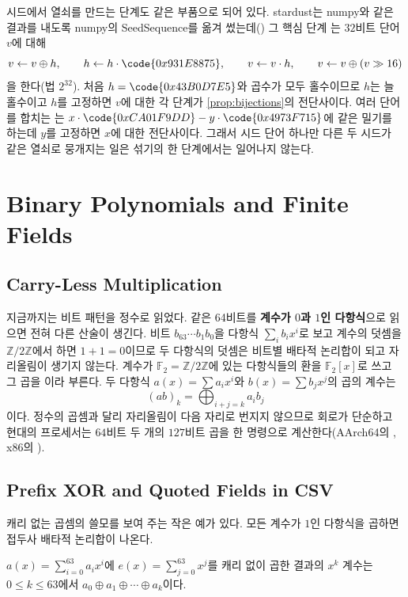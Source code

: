 시드에서 열쇠를 만드는 단계도 같은 부품으로 되어 있다. stardust는 numpy와 같은 결과를 내도록 numpy의 SeedSequence를 옮겨 썼는데() 그 핵심 단계 는 $32$비트 단어 $v$에 대해
\[
v\gets v\oplus h,\qquad h\gets h\cdot\code{0x931E8875},\qquad v\gets v\cdot h,\qquad v\gets v\oplus(v\gg16)
\]
을 한다(법 $2^{32}$). 처음 $h=\code{0x43B0D7E5}$와 곱수가 모두 홀수이므로 $h$는 늘 홀수이고 $h$를 고정하면 $v$에 대한 각 단계가 \cref{prop:bijections}의 전단사이다. 여러 단어를 합치는 는 $x\cdot\code{0xCA01F9DD}-y\cdot\code{0x4973F715}$에 같은 밀기를 하는데 $y$를 고정하면 $x$에 대한 전단사이다. 그래서 시드 단어 하나만 다른 두 시드가 같은 열쇠로 뭉개지는 일은 섞기의 한 단계에서는 일어나지 않는다.


\section{Binary Polynomials and Finite Fields}
\label{sec:gf2}

\subsection{Carry-Less Multiplication}

지금까지는 비트 패턴을 정수로 읽었다. 같은 64비트를 \textbf{계수가 $0$과 $1$인 다항식}으로 읽으면 전혀 다른 산술이 생긴다. 비트 $b_{63}\cdots b_1b_0$을 다항식 $\sum_ib_ix^i$로 보고 계수의 덧셈을 $\mathbb{Z}/2\mathbb{Z}$에서 하면 $1+1=0$이므로 두 다항식의 덧셈은 비트별 배타적 논리합이 되고 자리올림이 생기지 않는다. 계수가 $\mathbb{F}_2=\mathbb{Z}/2\mathbb{Z}$에 있는 다항식들의 환을 $\mathbb{F}_2[x]$로 쓰고 그 곱을 이라 부른다. 두 다항식 $a(x)=\sum a_ix^i$와 $b(x)=\sum b_jx^j$의 곱의 계수는
\[
(ab)_k=\bigoplus_{i+j=k}a_ib_j
\]
이다. 정수의 곱셈과 달리 자리올림이 다음 자리로 번지지 않으므로 회로가 단순하고 현대의 프로세서는 $64$비트 두 개의 $127$비트 곱을 한 명령으로 계산한다(AArch64의 , x86의 ).

\subsection{Prefix XOR and Quoted Fields in CSV}

캐리 없는 곱셈의 쓸모를 보여 주는 작은 예가 있다. 모든 계수가 $1$인 다항식을 곱하면 접두사 배타적 논리합이 나온다.

\begin{proposition}
\label{prop:prefix-xor}
$a(x)=\sum_{i=0}^{63}a_ix^i$에 $e(x)=\sum_{j=0}^{63}x^j$를 캐리 없이 곱한 결과의 $x^k$ 계수는 $0\le k\le63$에서 $a_0\oplus a_1\oplus\cdots\oplus a_k$이다.
\end{proposition}

